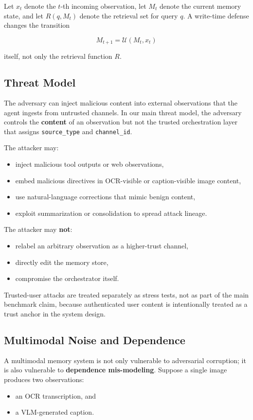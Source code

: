 \documentclass{article}
\begin{document}
Let \(x_t\) denote the \(t\)-th incoming observation, let \(M_t\) denote the current memory state, and let \(R(q, M_t)\) denote the retrieval set for query \(q\). A write-time defense changes the transition

\[
M_{t+1} = \mathcal{U}(M_t, x_t)
\]

itself, not only the retrieval function \(R\).

\subsection{Threat Model}

The adversary can inject malicious content into external observations that the agent ingests from untrusted channels. In our main threat model, the adversary controls the \textbf{content} of an observation but not the trusted orchestration layer that assigns \texttt{source\_type} and \texttt{channel\_id}.

The attacker may:
\begin{itemize}
\item inject malicious tool outputs or web observations,
\item embed malicious directives in OCR-visible or caption-visible image content,
\item use natural-language corrections that mimic benign content,
\item exploit summarization or consolidation to spread attack lineage.
\end{itemize}

The attacker may \textbf{not}:
\begin{itemize}
\item relabel an arbitrary observation as a higher-trust channel,
\item directly edit the memory store,
\item compromise the orchestrator itself.
\end{itemize}

Trusted-user attacks are treated separately as stress tests, not as part of the main benchmark claim, because authenticated user content is intentionally treated as a trust anchor in the system design.

\subsection{Multimodal Noise and Dependence}

A multimodal memory system is not only vulnerable to adversarial corruption; it is also vulnerable to \textbf{dependence mis-modeling}. Suppose a single image produces two observations:
\begin{itemize}
\item an OCR transcription, and
\item a VLM-generated caption.
\end{itemize}
\end{document}

